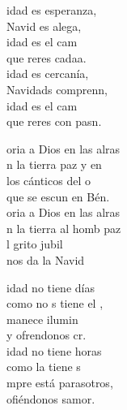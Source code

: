 \begin{cancion}%
	idad es esperanza, \\
	Navid es alega,\\
	idad es el cam \\
	que reres cadaa. \\
	idad es cercanía, \\
	Navidads comprenn, \\
	idad es el cam \\
	que reres con pasn. \jump\\
	\begin{chorus}%
		oria a Dios en las alras\\
		n la tierra paz y en\\
		los cánticos del o\\
		que se escun en Bén.\\
		oria a Dios en las alras\\
		n la tierra al homb paz\\
		l grito jubil\\
		 nos da la Navid\jump\\
	\end{chorus}%
	idad no tiene días \\
	como no s tiene el ,\\
	manece ilumin \\
	y ofrendonos cr. \\
	idad no tiene horas\\
	como  la tiene s\\
	mpre está parasotros,\\
	ofiéndonos samor.\\
\end{cancion}%
